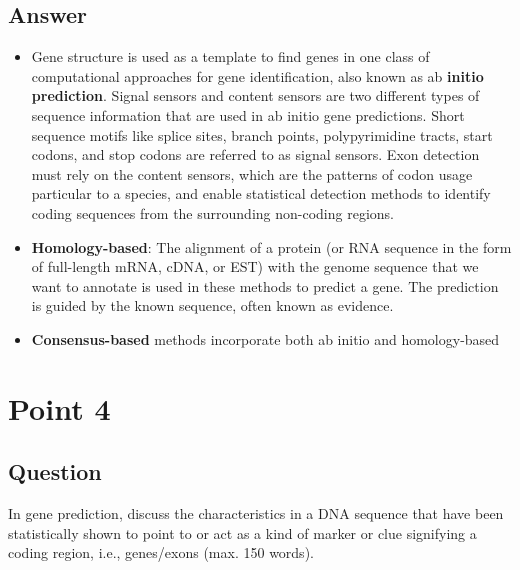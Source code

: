 \documentclass{article}
\begin{document}
\subsection*{Answer}
\begin{itemize}
    \item Gene structure is used as a template to find genes in one class of computational approaches for gene identification, also known as ab \textbf{initio prediction}. Signal sensors and content sensors are two different types of sequence information that are used in ab initio gene predictions. Short sequence motifs like splice sites, branch points, polypyrimidine tracts, start codons, and stop codons are referred to as signal sensors. Exon detection must rely on the content sensors, which are the patterns of codon usage particular to a species, and enable statistical detection methods to identify coding sequences from the surrounding non-coding regions.
    \item \textbf{Homology-based}: The alignment of a protein (or RNA sequence in the form of full-length mRNA, cDNA, or EST) with the genome sequence that we want to annotate is used in these methods to predict a gene. The prediction is guided by the known sequence, often known as evidence.
    \item \textbf{Consensus-based} methods incorporate both ab initio and homology-based 
\end{itemize}

\section{Point 4}
\subsection*{Question}
In gene prediction, discuss the characteristics in a DNA sequence that have been
statistically shown to point to or act as a kind of marker or clue signifying a coding
region, i.e., genes/exons (max. 150 words).
\end{document}
